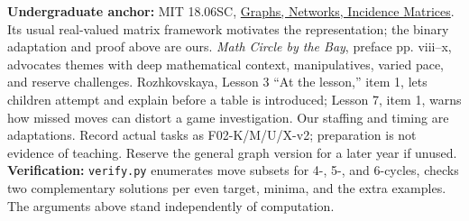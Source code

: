 \documentclass[12pt]{extarticle}
\begin{document}
\textbf{Undergraduate anchor:} MIT 18.06SC, \href{https://ocw.mit.edu/courses/18-06sc-linear-algebra-fall-2011/pages/ax-b-and-the-four-subspaces/graphs-networks-incidence-matrices/}{Graphs, Networks, Incidence Matrices}. Its usual real-valued matrix framework motivates the representation; the binary adaptation and proof above are ours.
\emph{Math Circle by the Bay}, preface pp. viii--x, advocates themes with deep mathematical context, manipulatives, varied pace, and reserve challenges. Rozhkovskaya, Lesson 3 ``At the lesson,'' item 1, lets children attempt and explain before a table is introduced; Lesson 7, item 1, warns how missed moves can distort a game investigation. Our staffing and timing are adaptations. Record actual tasks as F02-K/M/U/X-v2; preparation is not evidence of teaching. Reserve the general graph version for a later year if unused.
\textbf{Verification:} \texttt{verify.py} enumerates move subsets for 4-, 5-, and 6-cycles, checks two complementary solutions per even target, minima, and the extra examples. The arguments above stand independently of computation.
\end{document}

